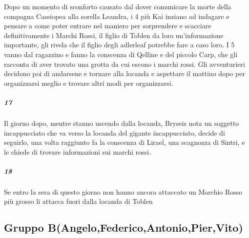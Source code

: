 \documentclass{article}
\begin{document}
    Dopo un momento di sconforto causato dal dover comunicare la morte della compagna Cassiopea alla sorella Leandra, i 4 più Kai inziano ad indagare e pensare a come poter entrare nel maniero per sorprendere e scacciare definitivamente i Marchi Rossi, il figlio di Toblen da loro un'informazione importante, gli rivela che il figlio degli adlerleaf potrebbe fare a caso loro. I 5 vanno dal ragazzino e fanno la conscenza di Qelline e del piccolo Carp, che gli racconta di aver trovato una grotta da cui escono i marchi rossi. Gli avventurieri decidono poi di andarsene e tornare alla locanda e aspettare il mattino dopo per organizzarsi meglio e trovare altri modi per organizzarsi. 
     \subparagraph{17}
     Il giorno dopo, mentre stanno uscendo dalla locanda, Bryseis nota un soggetto incappucciato che va verso la locanda del gigante incappucciato, decide di seguirlo, una volta raggiunto fa la conscenza di Lirael, una scagnozza di Sintri, e le chiede di trovare informazioni sui marchi rossi.
    \subparagraph{18}
    Se entro la sera di questo giorno non hanno ancora attaccato un Marchio Rosso più grosso li attacca fuori dalla locanda di Toblen
\subsection{Gruppo B(Angelo,Federico,Antonio,Pier,Vito)}
\end{document}
